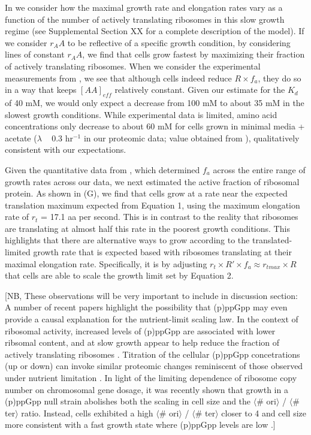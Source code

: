 In  we consider how the maximal growth rate and
elongation rates vary as a function of the number of actively translating
ribosomes in this slow growth regime (see Supplemental Section XX for a complete
description of the model). If we consider $r_AA$ to be reflective of a specific
growth condition, by considering lines of constant $r_AA$, we find that cells
grow fastest by maximizing their fraction of actively translating ribosomes.
When we consider the experimental measurements from \cite{dai2018}, we see
that although cells indeed reduce $R \times f_a$, they do so in a way that keeps
$[AA]_{eff}$ relatively constant. Given our estimate for the $K_d$ of 40 mM,  we
would only expect a decrease from 100 mM to about 35 mM in the slowest growth
conditions. While experimental data is limited, amino acid concentrations only
decrease to about 60 mM for cells grown in minimal media + acetate ($\lambda$ ~
0.3 hr$^{-1}$ in our proteomic data; value obtained from \cite{bennett2009}), qualitatively consistent with our expectations.

Given the quantitative data from \cite{dai2018}, which determined $f_a$
across the entire range of growth rates across our data, we next estimated the
active fraction of ribosomal protein. As shown in (G), we
find that cells grow at a rate near the expected translation maximum expected
from Equation 1, using the maximum elongation rate of $r_t$ = 17.1 aa per
second. This is in contrast to the reality that ribosomes are translating at
almost half this rate in the poorest growth conditions. This highlights that
there are alternative ways to grow according to the translated-limited growth
rate that is expected based with ribosomes translating at their maximal
elongation rate. Specifically, it is by adjusting $r_t \times R' \times f_a
\approx r_{tmax} \times R$ that cells are able to scale the growth limit set by
Equation 2.

[NB, These observations will be very important to include in
discussion section: A number of recent papers highlight the possibility that
(p)ppGpp may even provide a causal explanation for the nutrient-limit scaling
law. In the context of ribosomal activity, increased levels of (p)ppGpp are
associated with lower ribsomal content, and at slow growth appear to help reduce
the fraction of actively translating ribosomes \citep{dai2016, dai2018}.
Titration of the cellular (p)ppGpp concetrations (up or down) can invoke similar
proteomic changes reminiscent of those observed under nutrient limitation
\citep{zhu2019}. In light of the limiting dependence of ribosome copy number on
chromosomal gene dosage, it was recently shown that growth in a (p)ppGpp  null
strain abolishes both the scaling in cell size  and the $\langle$\# ori$\rangle$
/ $\langle$\# ter$\rangle$ ratio. Instead, cells exhibited a high $\langle$\#
ori$\rangle$ / $\langle$\# ter$\rangle$ closer to 4 and cell size more
consistent with a fast growth state where (p)ppGpp levels are low
\citep{fernandezcoll2020}.]




